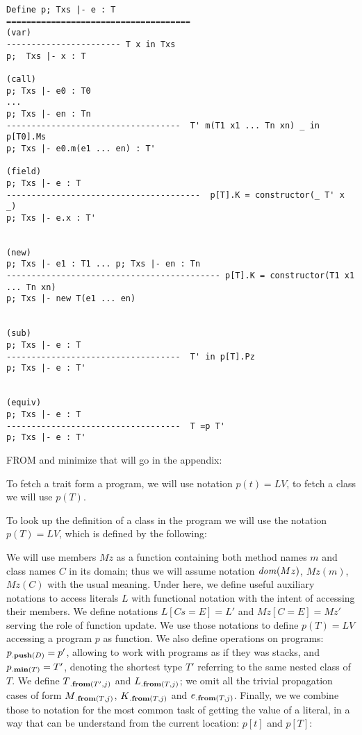 \begin{verbatim}
Define p; Txs |- e : T
=====================================
(var)
----------------------- T x in Txs
p;  Txs |- x : T

(call)
p; Txs |- e0 : T0
...
p; Txs |- en : Tn
-----------------------------------  T' m(T1 x1 ... Tn xn) _ in p[T0].Ms
p; Txs |- e0.m(e1 ... en) : T'

(field)
p; Txs |- e : T
---------------------------------------  p[T].K = constructor(_ T' x _)
p; Txs |- e.x : T'


(new)
p; Txs |- e1 : T1 ... p; Txs |- en : Tn
------------------------------------------- p[T].K = constructor(T1 x1 ... Tn xn)
p; Txs |- new T(e1 ... en)


(sub)
p; Txs |- e : T
-----------------------------------  T' in p[T].Pz
p; Txs |- e : T'


(equiv)
p; Txs |- e : T
-----------------------------------  T =p T'
p; Txs |- e : T'
\end{verbatim}





FROM and minimize that will go in the appendix:

To fetch a trait form a program, we will use notation $p(t)=LV$, to 
fetch a class we will use $p(T)$.

To look up the definition of a class in the program we will use the notation
$p(T)=\textit{LV}$, which is defined by the following:%

We will use members $Mz$ as a function containing both method names $m$
and class names $C$ in its domain; thus we will assume
notation $\mathit{dom}(Mz)$, $Mz(m)$, $Mz(C)$ with the usual meaning.
Under here, we define useful auxiliary notations to
access literals $L$ with functional notation with the intent of accessing their members. We define notations $L[Cs=E]=L'$ and $Mz[C=E]=Mz'$ serving the role of function update.
We use those notations to define $p(T)=LV$ accessing a program $p$ as function. We also define operations on programs: $p{{}_{.\textbf{push}({D})}}=p'$, allowing to work with programs as if they was stacks, and
$p{{}_{.\textbf{min}({T})}}=T'$, denoting the shortest type $T'$ referring to the same 
nested class of $T$.
We define $T{{}_{.\textbf{from}({T',j})}}$ and $L{{}_{.\textbf{from}({T,j})}}$; we omit all the trivial propagation cases of form $M{{}_{.\textbf{from}({T,j})}}$, $K{{}_{.\textbf{from}({T,j})}}$ and $e{{}_{.\textbf{from}({T,j})}}$.
Finally, we we combine those to notation for the
most common task of getting the value of a literal, in a way that can be understand from the current location: $p[t]$ and $p[T]$:


